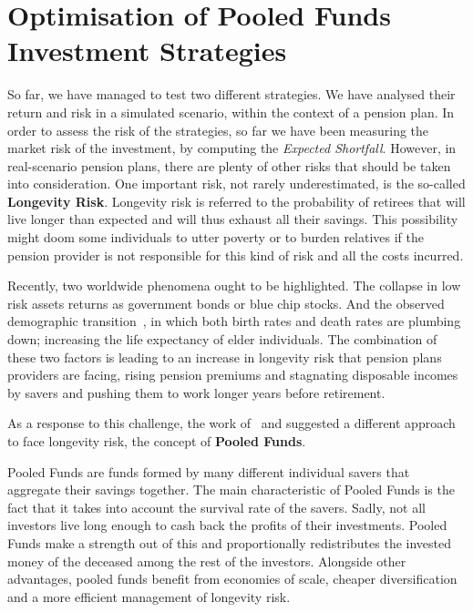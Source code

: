\section{Optimisation of Pooled Funds Investment Strategies}

So far, we have managed to test two different strategies. We have analysed their return and risk in a simulated scenario, within the context of a pension plan. In order to assess the risk of the strategies, so far we have been measuring the market risk of the investment, by computing the \emph{Expected Shortfall}. However, in real-scenario pension plans, there are plenty of other risks that should be taken into consideration. One important risk, not rarely underestimated, is the so-called \textbf{Longevity Risk}. Longevity risk is referred to the probability of retirees that will live longer than expected and will thus exhaust all their savings. This possibility might doom some individuals to utter poverty or to burden relatives if the pension provider is not responsible for this kind of risk and all the costs incurred.

Recently, two worldwide phenomena ought to be highlighted. The collapse in low risk assets returns as government bonds or blue chip stocks. And the observed demographic transition~\cite{b:demographic, a:bongaarts-human}, in which both birth rates and death rates are plumbing down; increasing the life expectancy of elder individuals. The combination of these two factors is leading to an increase in longevity risk that pension plans providers are facing, rising pension premiums and stagnating disposable incomes by savers and pushing them to work longer years before retirement.

As a response to this challenge, the work of~\cite{a:donnelly-transparency} and \cite{a:brautigam-pool} suggested a different approach to face longevity risk, the concept of \textbf{Pooled Funds}.

Pooled Funds are funds formed by many different individual savers that aggregate their savings together. The main characteristic of Pooled Funds is the fact that it takes into account the survival rate of the savers. Sadly, not all investors live long enough to cash back the profits of their investments. Pooled Funds make a strength out of this and proportionally redistributes the invested money of the deceased among the rest of the investors. Alongside other advantages, pooled funds benefit from economies of scale, cheaper diversification and a more efficient management of longevity risk.

